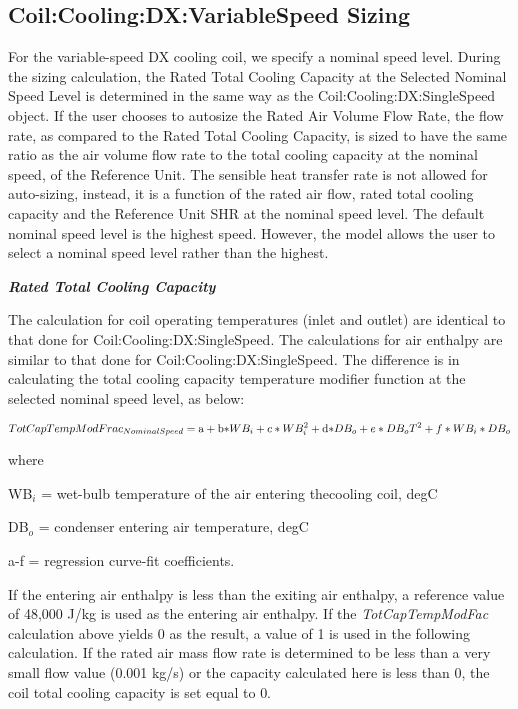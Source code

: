 \subsection{Coil:Cooling:DX:VariableSpeed Sizing}\label{coilcoolingdxvariablespeed-sizing}

For the variable-speed DX cooling coil, we specify a nominal speed level. During the sizing calculation, the Rated Total Cooling Capacity at the Selected Nominal Speed Level is determined in the same way as the Coil:Cooling:DX:SingleSpeed object. If the user chooses to autosize the Rated Air Volume Flow Rate, the flow rate, as compared to the Rated Total Cooling Capacity, is sized to have the same ratio as the air volume flow rate to the total cooling capacity at the nominal speed, of the Reference Unit. The sensible heat transfer rate is not allowed for auto-sizing, instead, it is a function of the rated air flow, rated total cooling capacity and the Reference Unit SHR at the nominal speed level. The default nominal speed level is the highest speed. However, the model allows the user to select a nominal speed level rather than the highest.

\textbf{\emph{Rated Total Cooling Capacity}}

The calculation for coil operating temperatures (inlet and outlet) are identical to that done for Coil:Cooling:DX:SingleSpeed. The calculations for air enthalpy are similar to that done for Coil:Cooling:DX:SingleSpeed\emph{.} The difference is in calculating the total cooling capacity temperature modifier function at the selected nominal speed level, as below:

\begin{equation}
TotCapTempModFra{c_{NominalSpeed}} = {\rm{a}} + {\rm{b*}}W{B_i} + c*WB_i^2 + {\rm{d*}}D{B_o} + e*D{B_o}{T^2} + f*W{B_i}*D{B_o}
\end{equation}

where

WB\(_{i}\) = wet-bulb temperature of the air entering thecooling coil, degC

DB\(_{o}\) = condenser entering air temperature, degC

a-f = regression curve-fit coefficients.

If the entering air enthalpy is less than the exiting air enthalpy, a reference value of 48,000 J/kg is used as the entering air enthalpy. If the \emph{TotCapTempModFac} calculation above yields 0 as the result, a value of 1 is used in the following calculation. If the rated air mass flow rate is determined to be less than a very small flow value (0.001 kg/s) or the capacity calculated here is less than 0, the coil total cooling capacity is set equal to 0.

